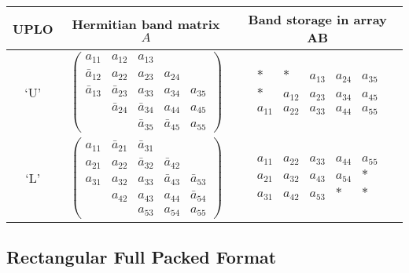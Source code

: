 \begin{center}
\begin{tabular}{|c|c|c|} \hline
UPLO & Hermitian band matrix $A$ & Band storage in array AB \\ \hline
`U' &
$
\left( \begin{array}{ccccc}
a_{11}       & a_{12}       & a_{13}       &              &        \\
\bar{a}_{12} & a_{22}       & a_{23}       & a_{24}       &        \\
\bar{a}_{13} & \bar{a}_{23} & a_{33}       & a_{34}       & a_{35} \\
             & \bar{a}_{24} & \bar{a}_{34} & a_{44}       & a_{45} \\
             &              & \bar{a}_{35} & \bar{a}_{45} & a_{55}
\end{array} \right)
$
&
$
\begin{array}{ccccc}
 \ast  &  \ast  & a_{13} & a_{24} & a_{35} \\
 \ast  & a_{12} & a_{23} & a_{34} & a_{45} \\
a_{11} & a_{22} & a_{33} & a_{44} & a_{55}
\end{array}
$
\\ \hline
`L' &
$
\left( \begin{array}{ccccc}
a_{11} & \bar{a}_{21} & \bar{a}_{31} &              &              \\
a_{21} & a_{22}       & \bar{a}_{32} & \bar{a}_{42} &              \\
a_{31} & a_{32}       & a_{33}       & \bar{a}_{43} & \bar{a}_{53} \\
       & a_{42}       & a_{43}       & a_{44}       & \bar{a}_{54} \\
       &              & a_{53}       & a_{54}       & a_{55}
\end{array} \right)
$
&
$
\begin{array}{ccccc}
a_{11} & a_{22} & a_{33} & a_{44} & a_{55} \\
a_{21} & a_{32} & a_{43} & a_{54} &  \ast  \\
a_{31} & a_{42} & a_{53} &  \ast  &  \ast 
\end{array}
$ 
\\ \hline
\end{tabular}
\end{center}

\subsection{Rectangular Full Packed Format}\label{subsecrfp}

